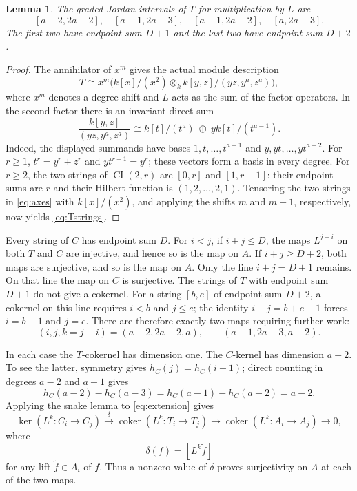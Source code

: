 \documentclass[11pt]{amsart}
\newtheorem{lemma}[theorem]{Lemma}
\theoremstyle{definition}
\newcommand{\CI}{\operatorname{CI}}
\newcommand{\coker}{\operatorname{coker}}
\begin{document}
\begin{lemma}\label{lem:T}
The graded Jordan intervals of $T$ for multiplication by $L$ are
\begin{equation}\label{eq:Tstrings}
 [a-2,2a-2],\quad [a-1,2a-3],\quad
 [a-1,2a-2],\quad [a,2a-3].
\end{equation}
The first two have endpoint sum $D+1$ and the last two have endpoint
sum $D+2$.
\end{lemma}

\begin{proof}
The annihilator of $x^m$ gives the actual module description
\[
 T\cong x^m\bigl(k[x]/(x^2)\otimes_k
             k[y,z]/(yz,y^a,z^a)\bigr),
\]
where $x^m$ denotes a degree shift and $L$ acts as the sum of the
factor operators. In the second factor there is an invariant direct sum
\begin{equation}\label{eq:axes}
 \frac{k[y,z]}{(yz,y^a,z^a)}
 \cong k[t]/(t^a)\ \oplus\ yk[t]/(t^{a-1}).
\end{equation}
Indeed, the displayed summands have bases
$1,t,\ldots,t^{a-1}$ and $y,yt,\ldots,yt^{a-2}$.
For $r\ge1$, $t^r=y^r+z^r$ and $yt^{r-1}=y^r$;
these vectors form a basis in every degree.
For $r\ge2$, the two strings of $\CI(2,r)$ are $[0,r]$ and
$[1,r-1]$: their endpoint sums are $r$ and their Hilbert function is
$(1,2,\ldots,2,1)$. Tensoring the two strings in \eqref{eq:axes}
with $k[x]/(x^2)$, and applying the shifts $m$ and $m+1$,
respectively, now yields \eqref{eq:Tstrings}.
\end{proof}

Every string of $C$ has endpoint sum $D$. For $i<j$, if $i+j\le D$,
the maps $L^{j-i}$ on both $T$ and $C$ are injective, and hence so is the
map on $A$. If $i+j\ge D+2$, both maps are surjective, and so is the
map on $A$. Only the line $i+j=D+1$ remains. On that line the map on
$C$ is surjective. The strings of $T$ with endpoint sum $D+1$ do not
give a cokernel. For a string $[b,e]$ of endpoint sum $D+2$, a cokernel
on this line requires $i<b$ and $j\le e$; the identity
$i+j=b+e-1$ forces $i=b-1$ and $j=e$.
There are therefore exactly two maps requiring further work:
\begin{equation}\label{eq:two}
 (i,j,k=j-i)=(a-2,2a-2,a),\qquad
             (a-1,2a-3,a-2).
\end{equation}

In each case the $T$-cokernel has dimension one. The $C$-kernel has
dimension $a-2$. To see the latter, symmetry gives
$h_C(j)=h_C(i-1)$; direct counting in degrees $a-2$ and $a-1$ gives
\[
 h_C(a-2)-h_C(a-3)=h_C(a-1)-h_C(a-2)=a-2.
\]
Applying the snake lemma to \eqref{eq:extension} gives
\begin{equation}\label{eq:delta}
 \ker(L^k:C_i\to C_j)\xrightarrow{\ \delta\ }
 \coker(L^k:T_i\to T_j)\longrightarrow
 \coker(L^k:A_i\to A_j)\longrightarrow0,
\end{equation}
where
\[
 \delta(f)=[L^k\widetilde f]
\]
for any lift $\widetilde f\in A_i$ of $f$. Thus a nonzero value of
$\delta$ proves surjectivity on $A$ at each of the two maps.
\end{document}
